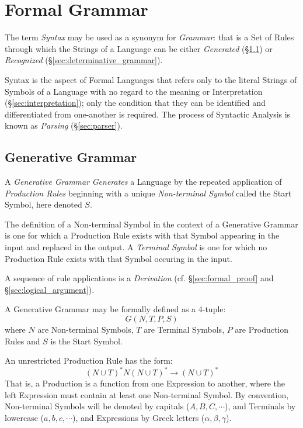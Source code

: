 \section{Formal Grammar}\label{sec:formal_grammar}

The term \emph{Syntax} may be used as a synonym for \emph{Grammar}:
that is a Set of Rules through which the Strings of a Language can be
either \emph{Generated} (\S\ref{sec:generative_grammar}) or
\emph{Recognized} (\S\ref{sec:determinative_grammar}).

Syntax is the aspect of Formal Languages that refers only to the
literal Strings of Symbols of a Language with no regard to the meaning
or Interpretation (\S\ref{sec:interpretation}); only the condition
that they can be identified and differentiated from one-another is
required. The process of Syntactic Analysis is known as \emph{Parsing}
(\S\ref{sec:parser}).



\subsection{Generative Grammar}\label{sec:generative_grammar}

A \emph{Generative Grammar} \emph{Generates} a Language by the
repeated application of \emph{Production Rules} beginning with a
unique \emph{Non-terminal Symbol} called the Start Symbol, here
denoted $S$.

The definition of a Non-terminal Symbol in the context of a Generative
Grammar is one for which a Production Rule exists with that Symbol
appearing in the input and replaced in the output. A \emph{Terminal
  Symbol} is one for which no Production Rule exists with that Symbol
occuring in the input.

A sequence of rule applications is a \emph{Derivation} (cf.
\S\ref{sec:formal_proof} and \S\ref{sec:logical_argument}).

A Generative Grammar may be formally defined as a 4-tuple:
\[
  G(N,T,P,S)
\]
where $N$ are Non-terminal Symbols, $T$ are Terminal Symbols, $P$ are
Production Rules and $S$ is the Start Symbol.

An unrestricted Production Rule has the form:
\[
  (N \cup T)^*N(N \cup T)^* \rightarrow (N \cup T)^*
\]
That is, a Production is a function from one Expression to
another, where the left Expression must contain at least one
Non-terminal Symbol. By convention, Non-terminal Symbols
will be denoted by capitals ($A,B,C,\cdots$), and Terminals by
lowercase ($a,b,c,\cdots$), and Expressions by Greek letters
($\alpha,\beta,\gamma$).



